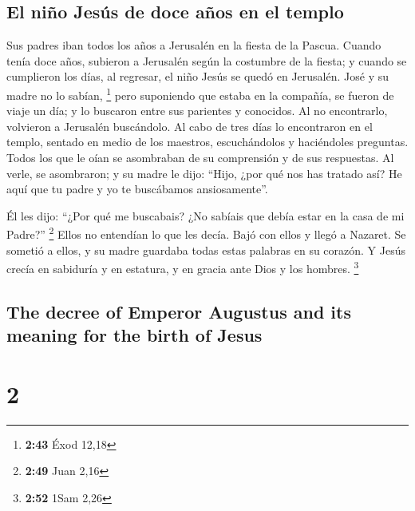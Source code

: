 \begin{paracol}{2}
\hypertarget{el-niuxf1o-jesuxfas-de-doce-auxf1os-en-el-templo}{%
\subsection{El niño Jesús de doce años en el
templo}\label{el-niuxf1o-jesuxfas-de-doce-auxf1os-en-el-templo}}

 Sus padres iban todos los años a Jerusalén en la fiesta
de la Pascua.  Cuando tenía doce años, subieron a
Jerusalén según la costumbre de la fiesta;  y cuando se
cumplieron los días, al regresar, el niño Jesús se quedó en Jerusalén.
José y su madre no lo sabían, \footnote{\textbf{2:43} Éxod 12,18}
 pero suponiendo que estaba en la compañía, se fueron de
viaje un día; y lo buscaron entre sus parientes y conocidos.
 Al no encontrarlo, volvieron a Jerusalén buscándolo.
 Al cabo de tres días lo encontraron en el templo,
sentado en medio de los maestros, escuchándolos y haciéndoles preguntas.
 Todos los que le oían se asombraban de su comprensión y
de sus respuestas.  Al verle, se asombraron; y su madre
le dijo: ``Hijo, ¿por qué nos has tratado así? He aquí que tu padre y yo
te buscábamos ansiosamente''.

 Él les dijo: ``¿Por qué me buscabais? ¿No sabíais que
debía estar en la casa de mi Padre?'' \footnote{\textbf{2:49} Juan 2,16}
 Ellos no entendían lo que les decía. 
Bajó con ellos y llegó a Nazaret. Se sometió a ellos, y su madre
guardaba todas estas palabras en su corazón.  Y Jesús
crecía en sabiduría y en estatura, y en gracia ante Dios y los hombres.
\footnote{\textbf{2:52} 1Sam 2,26}

\switchcolumn
\begin{otherlanguage}{english}

\hypertarget{the-decree-of-emperor-augustus-and-its-meaning-for-the-birth-of-jesus}{%
\subsection{The decree of Emperor Augustus and its meaning for the birth
of
Jesus}\label{the-decree-of-emperor-augustus-and-its-meaning-for-the-birth-of-jesus}}

\hypertarget{section-3}{%
\section{2}\label{section-3}}


\end{otherlanguage}
\end{paracol}
